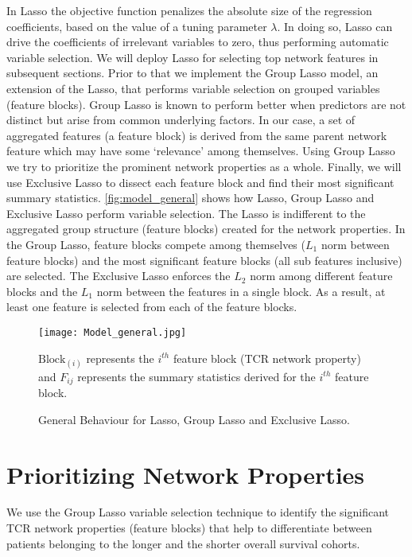  In Lasso the objective function penalizes the absolute size of the regression coefficients, based on the value of a tuning parameter $\lambda$. In doing so, Lasso can drive the coefficients of irrelevant variables to zero, thus performing automatic variable selection. We will deploy Lasso for selecting top network features in subsequent sections. Prior to that we implement the Group Lasso model, an extension of the Lasso, that performs variable selection on grouped variables (feature blocks). Group Lasso is known to perform better when predictors are not
distinct but arise from common underlying factors. In our case, a set of aggregated features (a feature block) is derived from the same parent network feature which may have some \lq relevance' among themselves. Using Group Lasso we try to prioritize the prominent network properties as a whole. Finally, we will use Exclusive Lasso to dissect each feature block and find their most significant summary statistics.
\autoref{fig:model_general} shows how Lasso, Group Lasso and Exclusive Lasso perform variable selection. The Lasso is indifferent to the aggregated group structure (feature blocks) created for the network properties. In the Group Lasso, feature blocks compete among themselves ($L_1$ norm between feature blocks) and the most significant feature blocks (all sub features inclusive) are selected. The Exclusive Lasso enforces the $L_2$ norm among different feature blocks and the $L_1$ norm between the features in a single block. As a result, at least one feature is selected from each of the feature blocks.\par

\begin{figure}[H]
\centering
\texttt{[image: Model\_general.jpg]}
\caption{General Behaviour for Lasso, Group Lasso and Exclusive Lasso.}%
{$\text{Block}_{(i)}$ represents the $i^{th}$ feature block (TCR network property) and $F_{ij}$ represents the summary statistics derived for the $i^{th}$ feature block.}
\label{fig:model_general}
\end{figure}
\section{Prioritizing Network Properties}\label{sec:priorntw}
We use the Group Lasso variable selection technique to identify the significant TCR network properties (feature blocks) that help to differentiate between patients belonging to the longer and the shorter overall survival cohorts.
